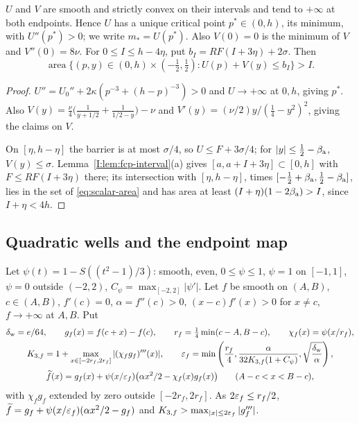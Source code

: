 \begin{lemma}\label{lem:scalar-area}
$U$ and $V$ are smooth and strictly convex on their intervals and tend to $+\infty$ at both endpoints. Hence $U$ has
a unique critical point $p^*\in(0,h)$, its minimum, with $U''(p^*)>0$; we write $m_*=U(p^*)$. Also $V(0)=0$ is the
minimum of $V$ and $V''(0)=8\nu$. For $0\le I\le h-4\eta$, put $b_I=RF(I+3\eta)+2\sigma$. Then
\begin{equation}\label{eq:scalar-area}
 \operatorname{area}\{(p,y)\in(0,h)\times(-\tfrac12,\tfrac12):U(p)+V(y)\le b_I\}>I.
\end{equation}
{\normalfont {}}
\end{lemma}

\begin{proof}
$U''=U_0''+2\kappa(p^{-3}+(h-p)^{-3})>0$ and $U\to+\infty$ at $0,h$, giving $p^*$. Also $V(y)=\frac\nu4\bigl(\frac1{y+1/2}+\frac1{1/2-y}\bigr)-\nu$ and $V'(y)=(\nu/2)y/(\frac14-y^2)^2$, giving the claims on $V$.

On $[\eta,h-\eta]$ the barrier is at most $\sigma/4$, so $U\le F+3\sigma/4$; for $|y|\le\frac12-\beta_{\rm a}$, $V(y)\le\sigma$. Lemma~\ref{I:lem:fcp-interval}(a) gives $[a,a+I+3\eta]\subset[0,h]$ with $F\le RF(I+3\eta)$ there; its intersection with $[\eta,h-\eta]$, times $[-\frac12+\beta_{\rm a},\frac12-\beta_{\rm a}]$, lies in the set of \eqref{eq:scalar-area} and has area at least $(I+\eta)(1-2\beta_{\rm a})>I$, since $I+\eta<4h$.
\end{proof}

\subsection{Quadratic wells and the endpoint map}\label{sec:scalar-wells}

Let $\psi(t)=1-S((t^2-1)/3)$: smooth, even, $0\le\psi\le1$, $\psi=1$ on $[-1,1]$, $\psi=0$ outside $(-2,2)$, $C_\psi=\max_{[-2,2]}|\psi'|$. Let $f$ be smooth on $(A,B)$, $c\in(A,B)$, $f'(c)=0$, $\alpha=f''(c)>0$, $(x-c)f'(x)>0$ for $x\ne c$, $f\to+\infty$ at $A,B$. Put
\begin{gather}\label{eq:scalar-quadratic-well}
 \delta_{\rm w}=e/64,\qquad g_f(x)=f(c+x)-f(c),\qquad r_f=\tfrac14\min(c-A,B-c),\qquad
 \chi_f(x)=\psi(x/r_f),\\
 K_{3,f}=1+\max_{x\in[-2r_f,2r_f]}|(\chi_fg_f)'''(x)|,\qquad
 \varepsilon_f=\min\left(\frac{r_f}{4},\frac{\alpha}{32K_{3,f}(1+C_\psi)},
                           \sqrt{\frac{\delta_{\rm w}}\alpha}\right),\notag\\
 \widetilde f(x)=g_f(x)+\psi(x/\varepsilon_f)\bigl(\alpha x^2/2-\chi_f(x)g_f(x)\bigr)\qquad(A-c<x<B-c),
 \notag
\end{gather}
with $\chi_fg_f$ extended by zero outside $[-2r_f,2r_f]$. As $2\varepsilon_f\le r_f/2$, $\widetilde f=g_f+\psi(x/\varepsilon_f)(\alpha x^2/2-g_f)$ and $K_{3,f}>\max_{|x|\le2\varepsilon_f}|g_f'''|$.

